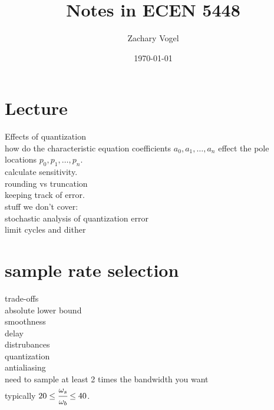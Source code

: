 \documentclass{article}
\author{Zachary Vogel}
\date{\today}
\title{Notes in ECEN 5448}
\begin{document}
\maketitle


\section*{Lecture}
Effects of quantization\\
how do the characteristic equation coefficients $a_0,a_1,\dots,a_n$ effect the pole locations $p_0,p_1,\dots,p_n$.\\
calculate sensitivity.\\

rounding vs truncation\\
keeping track of error.\\

stuff we don't cover:\\
stochastic analysis of quantization error\\
limit cycles and dither\\



\section*{sample rate selection}
trade-offs\\
absolute lower bound\\
smoothness\\
delay\\
distrubances\\
quantization\\
antialiasing\\

need to sample at least 2 times the bandwidth you want\\
typically $20\leq \cfrac{\omega_s}{\omega_b}\leq 40$.\\
\end{document}
